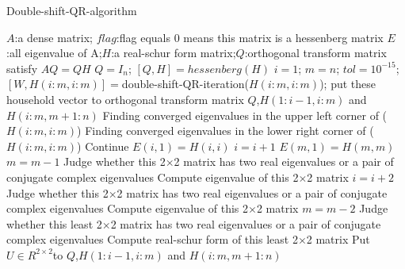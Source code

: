 \renewcommand{\algorithmicrequire}{\textbf{Input:}}
\renewcommand{\algorithmicensure}{\textbf{Output:}}
\begin{breakablealgorithm}
  \caption{Double-shift-QR-algorithm}
  \label{alg::Double-shift-QR-algorithm}
  \begin{algorithmic}[1]
  \Require $A$:a dense matrix; $flag$:flag equals 0 means this matrix is a hessenberg matrix
  \Ensure $E$:all eigenvalue of A;$H$:a real-schur form matrix;$Q$:orthogonal transform matrix satisfy \(AQ=QH\)
  \State\(Q={I_n}\);
    \State\([Q,H]=hessenberg(H)\)
  \EndIf
  \State\(i=1\);
  \State\(m=n\);
  \State\(tol={10^{-15}}\);
  \State\([W,H(i:m,i:m)]=\)double-shift-QR-iteration(\(H(i:m,i:m)\));
  \State put these household vector to orthogonal transform matrix $Q$,\(H(1:i-1,i:m)\) and \(H(i:m,m+1:n)\)
  \State Finding converged eigenvalues in the upper left corner of (\(H(i:m,i:m)\))
  \State Finding converged eigenvalues in the lower right corner of (\(H(i:m,i:m)\))
    \State Continue
  \EndIf
      \State\(E(i,1)=H(i,i)\)
      \State\(i=i+1\)
    \EndIf
      \State\(E(m,1)=H(m,m)\)
      \State\(m=m-1\)
    \EndIf
  \EndIf
      \State Judge whether this 2\(\times\)2 matrix has two real eigenvalues or a pair of conjugate complex eigenvalues
      \State Compute eigenvalue of this 2\(\times\)2 matrix
      \State\(i=i+2\)
    \EndIf
      \State Judge whether this 2\(\times\)2 matrix has two real eigenvalues or a pair of conjugate complex eigenvalues
      \State Compute eigenvalue of this 2\(\times\)2 matrix
      \State\(m=m-2\)
    \EndIf
  \EndIf
  \EndWhile
    \State Judge whether this least 2\(\times\)2 matrix has two real eigenvalues or a pair of conjugate complex eigenvalues
    \State Compute real-schur form of this least 2\(\times\)2 matrix
    \State Put \(U\in{R^{2\times 2}}\)to $Q$,\(H(1:i-1,i:m)\) and \(H(i:m,m+1:n)\)
  \EndIf
  \end{algorithmic}
\end{breakablealgorithm}